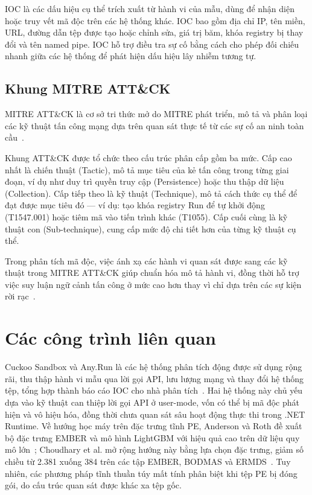 \documentclass[../DoAn.tex]{subfiles}
\begin{document}
IOC là các dấu hiệu
cụ thể trích xuất từ hành vi của mẫu, dùng để nhận diện hoặc truy vết
mã độc trên các hệ thống khác. IOC bao gồm địa chỉ IP, tên miền, URL,
đường dẫn tệp được tạo hoặc chỉnh sửa, giá trị băm, khóa
registry bị thay đổi và tên named pipe. IOC hỗ trợ điều tra sự cố
bằng cách cho phép đối chiếu nhanh giữa các hệ thống để phát hiện dấu
hiệu lây nhiễm tương tự.

\subsection{Khung MITRE ATT\&CK}
\label{section:2.4.5}

MITRE ATT\&CK
là cơ sở tri thức mở do MITRE phát triển, mô tả và phân loại các kỹ
thuật tấn công mạng dựa trên quan sát thực tế từ các sự cố an ninh
toàn cầu~\cite{mitre_attack}.

Khung ATT\&CK được tổ chức theo cấu trúc phân cấp gồm ba mức. Cấp 
cao nhất là chiến thuật (Tactic), mô tả mục tiêu của kẻ tấn công 
trong từng giai đoạn, ví dụ như duy trì quyền truy cập (Persistence) 
hoặc thu thập dữ liệu (Collection). Cấp tiếp theo là kỹ thuật (Technique), mô tả cách thức cụ thể để đạt
được mục tiêu đó — ví dụ: tạo khóa registry Run để tự khởi động
(T1547.001) hoặc tiêm mã vào tiến trình khác (T1055). Cấp cuối cùng là kỹ thuật con (Sub-technique), cung cấp 
mức độ chi tiết hơn của từng kỹ thuật cụ thể.

Trong phân tích mã độc, việc ánh xạ các hành vi quan sát được sang 
các kỹ thuật trong MITRE ATT\&CK giúp chuẩn hóa mô tả hành vi, đồng 
thời hỗ trợ việc suy luận ngữ cảnh tấn công ở mức cao hơn thay vì chỉ 
dựa trên các sự kiện rời rạc~\cite{mitre_attack}.

\section{Các công trình liên quan}
\label{section:2.5}

Cuckoo Sandbox và Any.Run là các hệ thống phân tích động được sử dụng
rộng rãi, thu thập hành vi mẫu qua lời gọi API, lưu lượng mạng và
thay đổi hệ thống tệp, tổng hợp thành báo cáo IOC cho nhà phân
tích~\cite{gibert2020}. Hai hệ thống này chủ yếu dựa vào kỹ thuật can
thiệp lời gọi API ở user-mode, vốn có thể bị mã độc phát
hiện và vô hiệu hóa, đồng thời chưa quan sát sâu hoạt động thực thi
trong .NET Runtime. Về hướng học máy trên đặc trưng tĩnh PE, Anderson
và Roth đề xuất bộ đặc trưng EMBER và mô hình LightGBM với hiệu quả
cao trên dữ liệu quy mô lớn~\cite{ember2018}; Choudhary et al. mở rộng
hướng này bằng lựa chọn đặc trưng, giảm số chiều từ 2.381 xuống 384
trên các tập EMBER, BODMAS và ERMDS~\cite{choudhary2025}. Tuy nhiên,
các phương pháp tĩnh thuần túy mất tính phân biệt khi tệp PE bị đóng
gói, do cấu trúc quan sát được khác xa tệp gốc.
\end{document}
